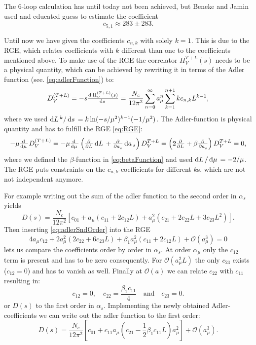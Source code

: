\documentclass[../../index.tex]{subfiles}
\begin{document}
The 6-loop calculation has until today not been achieved, but Beneke and Jamin
\cite{Beneke2008} used and educated guess to estimate the coefficient
\begin{equation}
  c_{5,1} \approx 283 \pm 283.
\end{equation}

Until now we have given the coefficients $c_{n,k}$ with solely $k=1$. This
is due to the RGE, which relates coefficients with $k$ different than one to the
coefficients mentioned above. To make use of the RGE the correlator $\Pi_V^{T+L}(s)$ needs to
be a physical quantity, which can be achieved by rewriting it in terms of the
Adler function (see. \cref{eq:adlerFunction}) to:
\begin{equation}
  D_V^{(T+L)} = - s \od{\Pi_V^{(T+L)}(s)}{s} = \frac{N_c}{12 \pi^2} \sum_{n=0}^\infty a_\mu^n \sum_{k=1}^{n+1} k c_{n,k} L^{k-1},
\end{equation}
where we used $\dif L^k/ \dif s=k\ln(-s/\mu^2)^{k-1}(-1/\mu^2)$. The
Adler-function is physical quantity and has to fulfill the RGE \cref{eq:RGE}:
\begin{equation}
  -\mu \od{}{\mu} D_V^{(T+L)} = -\mu \od{}{\mu} \left( \pd{}{L} \dif L + \pd{}{a_s} \dif a_s \right) D_V^{T+L}
  = \left( 2\pd{}{L} + \beta \pd{}{a_s} \right) D_V^{T+L} = 0,
\end{equation}
where we defined the $\beta$-function in \cref{eq:betaFunction} and used $\dif L
/ \dif \mu = - 2/ \mu$. The RGE puts constraints on the $c_{n, k}$-coefficients
for different $k$s, which are not not independent anymore.

For example writing out the sum of the adler function to the second order in
$\alpha_s$ yields
\begin{equation}
  \label{eq:adlerSndOrder}
  D(s) = \frac{N_c}{12 \pi^2} \left[ c_{01} + a_\mu(c_{11} + 2 c_{12} L) + a_\mu^2(c_{21} + 2 c_{22} L + 3 c_{23} L^2) \right].
\end{equation}
Then inserting \cref{eq:adlerSndOrder} into the RGE
\begin{equation}
  4 a_\mu c_{12} + 2 a_\mu^2(2 c_{22} + 6 c_{23} L) + \beta_1 a_\mu^2(c_{11} + 2 c_{12}L) + \mathcal{O}(a_\mu^3) = 0
\end{equation}
lets us compare the coefficients order by order in $\alpha_s$. At order
$\alpha_\mu$ only the $c_{12}$ term is present and has to be zero consequently.
For $\mathcal{O}(a_\mu^2 L)$ the only $c_{23}$ exists ($c_{12}=0$) and has to
vanish as well. Finally at $\mathcal{O}(a)$ we can relate $c_{22}$ with $c_{11}$
resulting in:
\begin{equation}
  c_{12} = 0, \quad c_{22} = \frac{\beta_1 c_{11}}{4} \quad \text{and} \quad c_{23} = 0.
\end{equation}
or $D(s)$ to the first order in $\alpha_s$. Implementing the newly obtained
Adler-coefficients we can write out the adler function to the first order:
\begin{equation}
  D(s) = \frac{N_c}{12 \pi^2} \left[ c_{01} + c_{11} a_\mu \left( c_{21} - \frac{1}{2} \beta_1 c_{11} L  \right) a_\mu^2 \right] + \mathcal{O}(a_\mu^3).
\end{equation}
\end{document}
